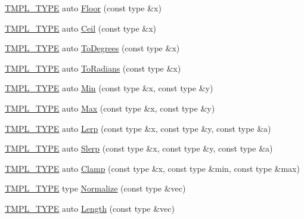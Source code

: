 \begin{DoxyCompactItemize}
\item 
\hyperlink{_math_8h_a2618808fbb8e74983f8aaea56d02752b}{T\+M\+P\+L\+\_\+\+T\+Y\+PE} auto \hyperlink{namespace_g_f_w_1_1_math_a96a1aa306548b7db3a16691a764bf318}{Floor} (const type \&x)
\item 
\hyperlink{_math_8h_a2618808fbb8e74983f8aaea56d02752b}{T\+M\+P\+L\+\_\+\+T\+Y\+PE} auto \hyperlink{namespace_g_f_w_1_1_math_a2d361153fe9eb8058606a3d626792335}{Ceil} (const type \&x)
\item 
\hyperlink{_math_8h_a2618808fbb8e74983f8aaea56d02752b}{T\+M\+P\+L\+\_\+\+T\+Y\+PE} auto \hyperlink{namespace_g_f_w_1_1_math_a47188afc3e58baa188b0cbb27b464517}{To\+Degrees} (const type \&x)
\item 
\hyperlink{_math_8h_a2618808fbb8e74983f8aaea56d02752b}{T\+M\+P\+L\+\_\+\+T\+Y\+PE} auto \hyperlink{namespace_g_f_w_1_1_math_aaad1ae6c65bfb2dc90697cd4b73e7d92}{To\+Radians} (const type \&x)
\item 
\hyperlink{_math_8h_a2618808fbb8e74983f8aaea56d02752b}{T\+M\+P\+L\+\_\+\+T\+Y\+PE} auto \hyperlink{namespace_g_f_w_1_1_math_ad39891804b4d4fc6da106f2cb6be74f4}{Min} (const type \&x, const type \&y)
\item 
\hyperlink{_math_8h_a2618808fbb8e74983f8aaea56d02752b}{T\+M\+P\+L\+\_\+\+T\+Y\+PE} auto \hyperlink{namespace_g_f_w_1_1_math_ae9361358f1332656368695fd2424f9fd}{Max} (const type \&x, const type \&y)
\item 
\hyperlink{_math_8h_a2618808fbb8e74983f8aaea56d02752b}{T\+M\+P\+L\+\_\+\+T\+Y\+PE} auto \hyperlink{namespace_g_f_w_1_1_math_a12b20a8879ba0442a79dd969e17783c2}{Lerp} (const type \&x, const type \&y, const type \&a)
\item 
\hyperlink{_math_8h_a2618808fbb8e74983f8aaea56d02752b}{T\+M\+P\+L\+\_\+\+T\+Y\+PE} auto \hyperlink{namespace_g_f_w_1_1_math_abf27a361df497eb49629cfe2e5f63b0c}{Slerp} (const type \&x, const type \&y, const type \&a)
\item 
\hyperlink{_math_8h_a2618808fbb8e74983f8aaea56d02752b}{T\+M\+P\+L\+\_\+\+T\+Y\+PE} auto \hyperlink{namespace_g_f_w_1_1_math_ae7bc49af6f56227878b1b85771f61009}{Clamp} (const type \&x, const type \&min, const type \&max)
\item 
\hyperlink{_math_8h_a2618808fbb8e74983f8aaea56d02752b}{T\+M\+P\+L\+\_\+\+T\+Y\+PE} type \hyperlink{namespace_g_f_w_1_1_math_a0d95c731b9233b5973fbf81eb2980c53}{Normalize} (const type \&vec)
\item 
\hyperlink{_math_8h_a2618808fbb8e74983f8aaea56d02752b}{T\+M\+P\+L\+\_\+\+T\+Y\+PE} auto \hyperlink{namespace_g_f_w_1_1_math_a5f579d8c6eecc3154ef5da6579a2039e}{Length} (const type \&vec)

\end{DoxyCompactItemize}
